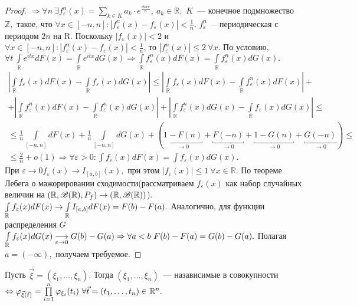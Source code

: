 \begin{proof}
		\noindent \(\Rightarrow \forall n ~ \exists f_\varepsilon^n(x) = \sum\limits_{k \in K} a_k\cdot e^{\frac{ik\pi x}{n}}, ~a_k \in \mathbb{R},\) \(K\)~--- конечное подмножество \(\mathbb{Z},\) такое, что \(\forall x \in [-n, n]: |f_\varepsilon^n(x) - f_\varepsilon(x)| < \frac{1}{n}.\) \(f_\varepsilon^n\)~---периодическая с периодом \(2n\) на \(\mathrm{R}\). Поскольку \(|f_\varepsilon(x)| < 2\) и \(\forall x \in [-n, n]: |f_\varepsilon^n(x) - f_\varepsilon(x)| < \frac{1}{n}\), то \(|f_\varepsilon^n(x)| \leqslant 2 ~ \forall x.\) По условию, \(\forall t~\int\limits_\mathbb{R} e^{itx}dF(x) = \int\limits_\mathbb{R} e^{itx}dG(x) \Rightarrow \int\limits_\mathbb{R} f_\varepsilon^n(x)dF(x) = \int\limits_\mathbb{R} f_\varepsilon^n(x)dG(x).\)
		\begin{gather*}
			\left|\int\limits_\mathbb{R} f_\varepsilon(x) dF(x) - \int\limits_\mathbb{R} f_\varepsilon(x)dG(x)\right| \leqslant \left|\int\limits_\mathbb{R} f_\varepsilon(x) dF(x) - \int\limits_\mathbb{R} f_\varepsilon^n(x) dF(x)\right| +\\
			+  \left|\int\limits_\mathbb{R} f_\varepsilon^n(x) dF(x) - \int\limits_\mathbb{R} f_\varepsilon^n(x) dG(x)\right| + \left|\int\limits_\mathbb{R} f_\varepsilon^n(x) dG(x) - \int\limits_\mathbb{R} f_\varepsilon(x) dG(x)\right| \leqslant\\
			\leqslant \frac{1}{n} \int\limits_{[-n,n]}dF(x) + \frac{1}{n} \int\limits_{[-n,n]}dG(x) +(\underbracket{1 - F(n)}_{\to 0} + \underbracket{F(-n)}_{\to 0} + \underbracket{1 - G(n)}_{\to 0} + \underbracket{G(-n)}_{\to 0}) \leqslant\\
			\leqslant \frac{2}{n} + o(1) \Rightarrow \forall \varepsilon> 0: \int f_\varepsilon(x) dF(x) = \int f_\varepsilon(x)dG(x).
		\end{gather*}
		При \(\varepsilon \to 0 f_\varepsilon(x) \to I_{[a,b]}(x),\) при этом \(|f_\varepsilon(x)| \leqslant 1~ \forall x \in \mathbb{R}.\) По теореме Лебега о мажорировании сходимости(рассматриваем \(f_\varepsilon(x)\) как набор случайных величин на \((\mathbb{R}, \mathscr{B}(\mathbb{R}), P_f) \to (\mathbb{R}, \mathscr{B}(\mathbb{R}))\)).
		\(\int\limits_{\mathbb{R}} f_\varepsilon(x)dF(x) \to \int\limits_{\mathbb{R}} I_{[a,b]}dF(x) = F(b) - F(a).\)
		Аналогично, для функции распределения \(G\) \(\int\limits_{\mathbb{R}} f_\varepsilon(x)dG(x) \underset{\varepsilon \to 0}{\longrightarrow} G(b) - G(a) \Rightarrow \forall a < b ~ F(b) - F(a) = G(b) - G(a).\)  Полагая \(a = (-\infty), \) получаем требуемое.
	\end{proof}

	\begin{theorem}
		Пусть \(\vec{\xi} = (\xi_1, \ldots, \xi_n).\) Тогда \((\xi_1, \ldots, \xi_n)\)~--- назависимые в совокупности \(\Leftrightarrow \varphi_{\vec{\xi}(\vec{t})} = \prod\limits_{i = 1}^n \varphi_{\xi_i}(t_i) ~\forall \vec{t} = (t_1, \ldots, t_n) \in \mathbb{R}^n.\)
	\end{theorem}

